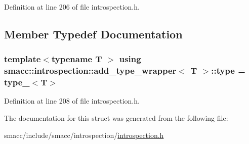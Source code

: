 Definition at line 206 of file introspection.\+h.



\subsection{Member Typedef Documentation}
\subsubsection[{\texorpdfstring{type}{type}}]{\setlength{\rightskip}{0pt plus 5cm}template$<$typename T $>$ using {\bf smacc\+::introspection\+::add\+\_\+type\+\_\+wrapper}$<$ T $>$\+::{\bf type} =  {\bf type\+\_\+}$<$T$>$}\hypertarget{structsmacc_1_1introspection_1_1add__type__wrapper_a4390a0426686e1e115d4c3ad22165cd9}{}\label{structsmacc_1_1introspection_1_1add__type__wrapper_a4390a0426686e1e115d4c3ad22165cd9}


Definition at line 208 of file introspection.\+h.



The documentation for this struct was generated from the following file\+:\begin{DoxyCompactItemize}
\item 
smacc/include/smacc/introspection/\hyperlink{introspection_8h}{introspection.\+h}\end{DoxyCompactItemize}

